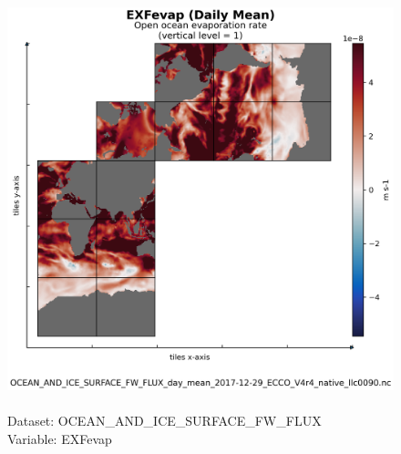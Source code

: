 \begin{figure}[H]
\centering
\includegraphics[scale=0.5]{../images/plots/native_plots/Ocean_and_Sea-Ice_Surface_Freshwater_Fluxes/EXFevap.png}
\caption{\\Dataset: OCEAN\_AND\_ICE\_SURFACE\_FW\_FLUX\\Variable: EXFevap}
\label{tab:table-OCEAN_AND_ICE_SURFACE_FW_FLUX_EXFevap-Plot}
\end{figure}
\pagebreak
